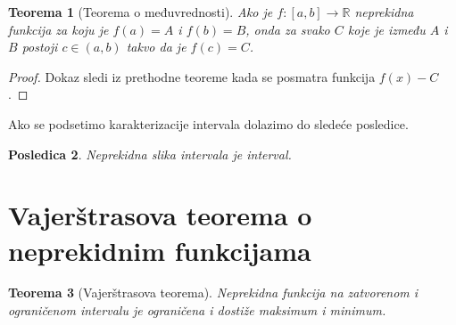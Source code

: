 \documentclass[a4paper,12pt]{article}
\theoremstyle{plain}
\newtheorem{theorem}{Teorema}[section]
\newtheorem{corollary}[theorem]{Posledica}
\theoremstyle{definition}
\theoremstyle{remark}
\begin{document}
\begin{theorem}[Teorema o međuvrednosti]
Ako je $f : [a,b] \rightarrow \mathbb{R}$ neprekidna funkcija za koju je $f(a) = A$ i $f(b) = B$, onda za svako $C$ koje je između $A$ i $B$ postoji $c \in (a,b)$ takvo da je $f(c) = C$.
\end{theorem}

\begin{proof}
Dokaz sledi iz prethodne teoreme kada se posmatra funkcija $f(x) - C$.
\end{proof}

Ako se podsetimo karakterizacije intervala dolazimo do sledeće posledice.

\begin{corollary}
Neprekidna slika intervala je interval.
\end{corollary}

\section{Vajerštrasova teorema o neprekidnim funkcijama}

\begin{theorem}[Vajerštrasova teorema]
Neprekidna funkcija na zatvorenom i ograničenom intervalu je ograničena i dostiže maksimum i minimum.
\end{theorem}
\end{document}
